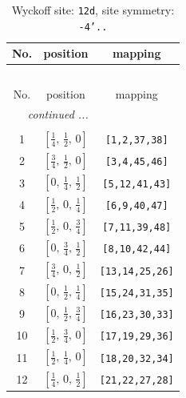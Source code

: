 \documentclass[fleqn,8pt]{jsarticle}
\begin{document}
\begin{longtable}{ccc}
\caption{Wyckoff site: {\tt 12d}, site symmetry: {\tt -4'..}}
 \\
 \hline \hline
No. & position & mapping \\ \hline \endfirsthead

\multicolumn{2}{l}{\tablename\ \thetable{}} \\
 \hline \hline
No. & position & mapping \\ \hline \endhead

 \hline \hline
\multicolumn{2}{r}{\footnotesize\it continued ...} \\ \endfoot

 \hline \hline
\multicolumn{2}{r}{} \\ \endlastfoot

1 & $\left[ \frac{1}{4},\, \frac{1}{2},\, 0 \right]$ & {\tt [1,2,37,38]} \\ \hline
2 & $\left[ \frac{3}{4},\, \frac{1}{2},\, 0 \right]$ & {\tt [3,4,45,46]} \\ \hline
3 & $\left[ 0,\, \frac{1}{4},\, \frac{1}{2} \right]$ & {\tt [5,12,41,43]} \\ \hline
4 & $\left[ \frac{1}{2},\, 0,\, \frac{1}{4} \right]$ & {\tt [6,9,40,47]} \\ \hline
5 & $\left[ \frac{1}{2},\, 0,\, \frac{3}{4} \right]$ & {\tt [7,11,39,48]} \\ \hline
6 & $\left[ 0,\, \frac{3}{4},\, \frac{1}{2} \right]$ & {\tt [8,10,42,44]} \\ \hline
7 & $\left[ \frac{3}{4},\, 0,\, \frac{1}{2} \right]$ & {\tt [13,14,25,26]} \\ \hline
8 & $\left[ 0,\, \frac{1}{2},\, \frac{1}{4} \right]$ & {\tt [15,24,31,35]} \\ \hline
9 & $\left[ 0,\, \frac{1}{2},\, \frac{3}{4} \right]$ & {\tt [16,23,30,33]} \\ \hline
10 & $\left[ \frac{1}{2},\, \frac{3}{4},\, 0 \right]$ & {\tt [17,19,29,36]} \\ \hline
11 & $\left[ \frac{1}{2},\, \frac{1}{4},\, 0 \right]$ & {\tt [18,20,32,34]} \\ \hline
12 & $\left[ \frac{1}{4},\, 0,\, \frac{1}{2} \right]$ & {\tt [21,22,27,28]} \\
\end{longtable}
\renewcommand{\arraystretch}{1.2}
\end{document}
